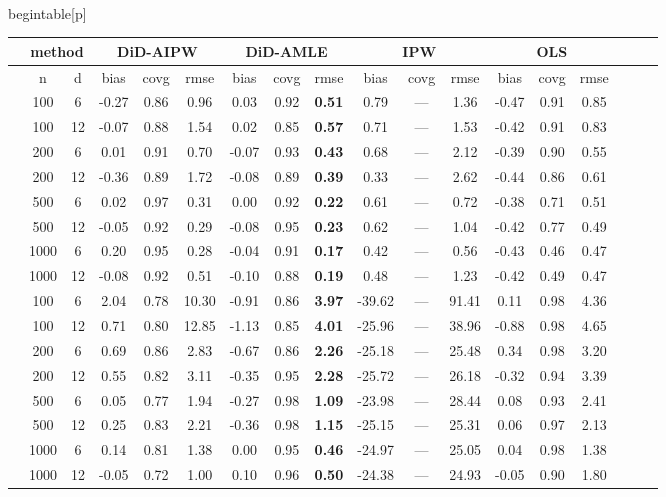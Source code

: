 \\begin{table}[p]
\begin{tabular}{||c|cc||ccc|ccc|ccc|ccc|ccc|}
\hline
\hline
&  \multicolumn{2}{c|}{method} &   \multicolumn{3}{c|}{DiD-AIPW} & \multicolumn{3}{c|}{DiD-AMLE} & \multicolumn{3}{c|}{IPW}  & \multicolumn{3}{c|}{OLS}\\
  \hline
& n & d &  bias & covg & rmse & bias & covg & rmse  & bias & covg & rmse & bias & covg & rmse \\ 
  \hline
\parbox[t]{3.5mm}{}
 & 100 &   6 & -0.27 & 0.86 & 0.96 & 0.03 & 0.92 & \bf 0.51 & 0.79 & --- & 1.36 & -0.47 & 0.91 & 0.85 \\ 
   & 100 &  12 & -0.07 & 0.88 & 1.54 & 0.02 & 0.85 & \bf 0.57 & 0.71 & --- & 1.53 & -0.42 & 0.91 & 0.83 \\ 
   & 200 &   6 & 0.01 & 0.91 & 0.70 & -0.07 & 0.93 & \bf 0.43 & 0.68 & --- & 2.12 & -0.39 & 0.90 & 0.55 \\ 
   & 200 &  12 & -0.36 & 0.89 & 1.72 & -0.08 & 0.89 & \bf 0.39 & 0.33 & --- & 2.62 & -0.44 & 0.86 & 0.61 \\ 
   & 500 &   6 & 0.02 & 0.97 & 0.31 & 0.00 & 0.92 & \bf 0.22 & 0.61 & --- & 0.72 & -0.38 & 0.71 & 0.51 \\ 
   & 500 &  12 & -0.05 & 0.92 & 0.29 & -0.08 & 0.95 & \bf 0.23 & 0.62 & --- & 1.04 & -0.42 & 0.77 & 0.49 \\ 
   & 1000 &   6 & 0.20 & 0.95 & 0.28 & -0.04 & 0.91 & \bf 0.17 & 0.42 & --- & 0.56 & -0.43 & 0.46 & 0.47 \\ 
   & 1000 &  12 & -0.08 & 0.92 & 0.51 & -0.10 & 0.88 & \bf 0.19 & 0.48 & --- & 1.23 & -0.42 & 0.49 & 0.47 \\ 
   \hline
\parbox[t]{3.5mm}{}

 & 100 &   6 & 2.04 & 0.78 & 10.30 & -0.91 & 0.86 & \bf 3.97 & -39.62 & --- & 91.41 & 0.11 & 0.98 & 4.36 \\ 
   & 100 &  12 & 0.71 & 0.80 & 12.85 & -1.13 & 0.85 & \bf 4.01 & -25.96 & --- & 38.96 & -0.88 & 0.98 & 4.65 \\ 
   & 200 &   6 & 0.69 & 0.86 & 2.83 & -0.67 & 0.86 & \bf 2.26 & -25.18 & --- & 25.48 & 0.34 & 0.98 & 3.20 \\ 
   & 200 &  12 & 0.55 & 0.82 & 3.11 & -0.35 & 0.95 & \bf 2.28 & -25.72 & --- & 26.18 & -0.32 & 0.94 & 3.39 \\ 
   & 500 &   6 & 0.05 & 0.77 & 1.94 & -0.27 & 0.98 & \bf 1.09 & -23.98 & --- & 28.44 & 0.08 & 0.93 & 2.41 \\ 
   & 500 &  12 & 0.25 & 0.83 & 2.21 & -0.36 & 0.98 & \bf 1.15 & -25.15 & --- & 25.31 & 0.06 & 0.97 & 2.13 \\ 
   & 1000 &   6 & 0.14 & 0.81 & 1.38 & 0.00 & 0.95 & \bf 0.46 & -24.97 & --- & 25.05 & 0.04 & 0.98 & 1.38 \\ 
   & 1000 &  12 & -0.05 & 0.72 & 1.00 & 0.10 & 0.96 & \bf 0.50 & -24.38 & --- & 24.93 & -0.05 & 0.90 & 1.80 \\  


\end{tabular}
